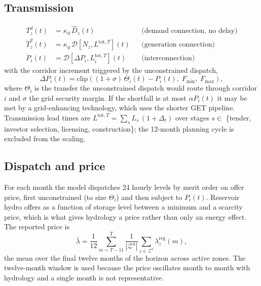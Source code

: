 \documentclass[11pt]{article}
\begin{document}
\subsection{Transmission}

\begin{align}
  T^{d}_{z}(t) &= \kappa_d \, \hat{D}_z(t) && \text{(demand connection, no delay)} \\
  \dot{T}^{g}_{z}(t) &= \kappa_g \, \mathcal{D}\!\left[N_{z}, L^{\text{tot},T}\right](t)
    && \text{(generation connection)} \\
  \dot{P}_i(t) &= \mathcal{D}\!\left[\Delta P_i, L^{\text{tot},T}_{i}\right](t)
    && \text{(interconnection)}
\end{align}
with the corridor increment triggered by the unconstrained dispatch,
\begin{equation}
  \Delta P_i(t) = \mathrm{clip}\!\left(
    (1+\sigma)\,\Theta_i(t) - P_i(t),\; F_{\min},\; F_{\max}\right),
\end{equation}
where $\Theta_i$ is the transfer the unconstrained dispatch would route through
corridor $i$ and $\sigma$ the grid security margin. If the shortfall is at most
$\alpha P_i(t)$ it may be met by a grid-enhancing technology, which uses the shorter
GET pipeline. Transmission lead times are
$L^{\text{tot},T} = \sum_{s} L_{s}\,(1+\Delta_t)$ over stages $s \in$ \{tender,
investor selection, licensing, construction\}; the 12-month planning cycle is
excluded from the scaling.

\subsection{Dispatch and price}

For each month the model dispatches 24 hourly levels by merit order on offer price,
first unconstrained (to size $\Theta_i$) and then subject to $P_i(t)$. Reservoir
hydro offers as a function of storage level between a minimum and a scarcity price,
which is what gives hydrology a price rather than only an energy effect. The
reported price is
\begin{equation}
  \bar{\lambda} = \frac{1}{12}\sum_{m=T-11}^{T}
    \frac{1}{|\mathcal{Z}^{a}|}\sum_{z \in \mathcal{Z}^{a}} \lambda^{\text{reg}}_{z}(m),
\end{equation}
the mean over the final twelve months of the horizon across active zones. The
twelve-month window is used because the price oscillates month to month with
hydrology and a single month is not representative.
\end{document}
